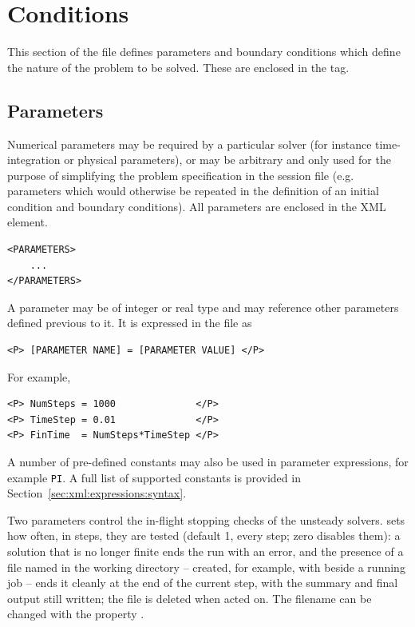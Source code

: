 \section{Conditions}
This section of the file defines parameters and boundary conditions which
define the nature of the problem to be solved. These are enclosed in the
 tag.

\subsection{Parameters}

Numerical parameters may be required by a particular solver (for instance time-integration or physical parameters), or may be arbitrary and only used for the purpose of simplifying the problem specification in the session file (e.g. parameters which would otherwise be repeated in the definition of an initial
condition and boundary conditions). All parameters are enclosed in the  XML element.

\begin{lstlisting}[style=XMLStyle] 
<PARAMETERS>
    ...
</PARAMETERS>
\end{lstlisting}

A parameter may be of integer or real type and may reference other parameters
defined previous to it. It is expressed in the file as

\begin{lstlisting}[style=XMLStyle]
<P> [PARAMETER NAME] = [PARAMETER VALUE] </P>
\end{lstlisting}

For example,

\begin{lstlisting}[style=XMLStyle]
<P> NumSteps = 1000              </P>
<P> TimeStep = 0.01              </P>
<P> FinTime  = NumSteps*TimeStep </P>
\end{lstlisting}

A number of pre-defined constants may also be used in parameter expressions, for example \texttt{PI}. A full list of supported constants is provided in Section~\ref{sec:xml:expressions:syntax}.

Two parameters control the in-flight stopping checks of the unsteady
solvers.  sets how often, in steps, they are tested
(default 1, every step; zero disables them): a solution that is no longer
finite ends the run with an error, and the presence of a file named
 in the working directory -- created, for example, with
 beside a running job -- ends it cleanly at the end of
the current step, with the summary and final output still written; the
file is deleted when acted on. The filename can be changed with the
 property .

